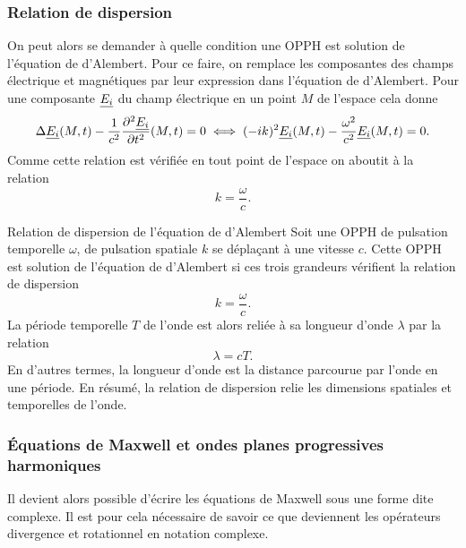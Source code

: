 \subsubsection{Relation de dispersion}
On peut alors se demander à quelle condition une OPPH est solution de l'équation de
d'Alembert.
Pour ce faire, on remplace les composantes des champs électrique et magnétiques 
par leur expression dans l'équation de d'Alembert. Pour une composante 
$\underline{E_i}$ du champ électrique en un point $M$ de l'espace cela donne
\begin{equation*}
	\Delta \underline{E_i}(M, t) -\dfrac{1}{c^2} \dfrac{\partial ^2\underline{E_i}}{\partial t^2}(M, t) = 0
	\iff (-ik)^2 \underline{E_i}(M, t) - \dfrac{\omega^2}{c^2} 
	\underline{E_i}(M, t) = 0.
\end{equation*}
Comme cette relation est vérifiée en tout point de l'espace on aboutit à la relation
\begin{equation*}
	\boxed{
	k = \frac{\omega}{c}.
	      }
\end{equation*}

\begin{defn}{Relation de dispersion de l'équation de d'Alembert}
	Soit une OPPH de pulsation temporelle $\omega$, de pulsation 
	spatiale $k$ se déplaçant à une vitesse $c$. Cette OPPH est solution
	de l'équation de d'Alembert si ces trois grandeurs vérifient la
	relation de dispersion
	\begin{equation}
		k = \dfrac{\omega}{c}.
	\end{equation}
	La période temporelle $T$ de l'onde est alors reliée à sa longueur d'onde
	$\lambda$ par la relation 
	\begin{equation}
		\lambda = c T.
	\end{equation}
	En d'autres termes, la longueur d'onde est la distance parcourue par l'onde
	en une période. En résumé, la relation de dispersion relie les 
	dimensions spatiales et temporelles de l'onde.
\end{defn}

\subsubsection{Équations de Maxwell et ondes planes progressives harmoniques}
Il devient alors possible d'écrire les équations de Maxwell sous une forme
dite complexe. Il est pour cela nécessaire de savoir ce que deviennent 
les opérateurs divergence et rotationnel en notation complexe. 


